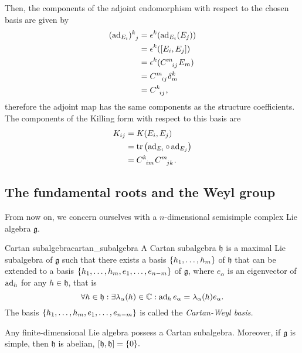 Then, the components of the adjoint endomorphism with respect to the chosen basis are given by
\begin{align*}
    (\ad{E_i})\indices{^k_j} &= \epsilon^k (\ad{E_i}(E_j))\\
                             &= \epsilon^k([E_i, E_j])\\
                             &= \epsilon^k(C\indices{^m_{ij}}E_m)\\
                             &= C\indices{^m_{ij}} \delta^k_m\\
                             &= C\indices{^k_{ij}},
\end{align*}
therefore the adjoint map has the same components as the structure coefficients.
The components of the Killing form with respect to this basis are
\begin{align*}
    K_{ij} &= K(E_i, E_j)\\
           &= \tr\left(\ad{E_i} \circ \ad{E_j}\right)\\
           &= C\indices{^k_{im}}C\indices{^m_{jk}}.
\end{align*}

\subsection{The fundamental roots and the Weyl group}
From now on, we concern ourselves with a \(n\)-dimensional semisimple complex Lie algebra \(\mathfrak{g}\).

\begin{definition}{Cartan subalgebra}{cartan_subalgebra}
    A Cartan subalgebra \(\mathfrak{h}\) is a maximal Lie subalgebra of \(\mathfrak{g}\) such that there exists a basis \(\{h_1, \dots, h_m\}\) of \(\mathfrak{h}\) that can be extended to a basis \(\{h_1, \dots, h_m, e_1, \dots, e_{n-m}\}\) of \(\mathfrak{g}\), where \(e_{\alpha}\) is an eigenvector of \(\operatorname{ad}_{h}\) for any \(h \in \mathfrak{h}\), that is
    \begin{equation*}
        \forall h \in \mathfrak{h} : \exists \lambda_{\alpha}(h) \in \mathbb{C} : \operatorname{ad}_{h}e_{\alpha} = \lambda_{\alpha}(h) e_{\alpha}.
    \end{equation*}
    The basis \(\{h_1, \dots, h_m, e_1, \dots, e_{n-m}\}\) is called the \emph{Cartan-Weyl basis.}
\end{definition}
\begin{remark}
    Any finite-dimensional Lie algebra possess a Cartan subalgebra. Moreover, if \(\mathfrak{g}\) is simple, then \(\mathfrak{h}\) is abelian, \([\mathfrak{h}, \mathfrak{h}] = \{0\}.\)
\end{remark}

